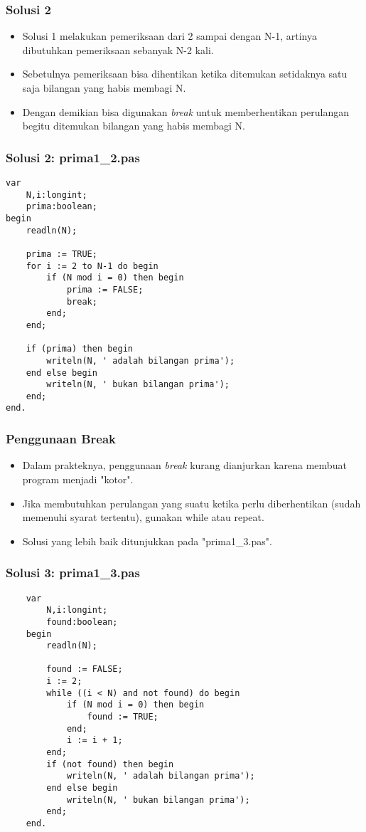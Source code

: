 \documentclass{beamer}
\begin{document}
\begin{frame}
\frametitle{Solusi 2}
\begin{itemize}
	\item Solusi 1 melakukan pemeriksaan dari 2 sampai dengan N-1, artinya dibutuhkan pemeriksaan sebanyak N-2 kali.
	\item Sebetulnya pemeriksaan bisa dihentikan ketika ditemukan setidaknya satu saja bilangan yang habis membagi N.
	\item Dengan demikian bisa digunakan \textit{break} untuk memberhentikan perulangan begitu ditemukan bilangan yang habis membagi N.
\end{itemize}
\end{frame}

\begin{frame}[fragile]
\frametitle{Solusi 2: prima1\_2.pas}
\begin{lstlisting}
var
    N,i:longint;
    prima:boolean;
begin
    readln(N);

    prima := TRUE;
    for i := 2 to N-1 do begin
        if (N mod i = 0) then begin
            prima := FALSE;
            break;
        end;
    end;

    if (prima) then begin
        writeln(N, ' adalah bilangan prima');
    end else begin
        writeln(N, ' bukan bilangan prima');
    end;
end.
\end{lstlisting}
\end{frame}

\begin{frame}
\frametitle{Penggunaan Break}
\begin{itemize}
	\item Dalam prakteknya, penggunaan \textit{break} kurang dianjurkan karena membuat program menjadi "kotor".
	\item Jika membutuhkan perulangan yang suatu ketika perlu diberhentikan (sudah memenuhi syarat tertentu), gunakan while atau repeat.
	\item Solusi yang lebih baik ditunjukkan pada "prima1\_3.pas".
\end{itemize}
\end{frame}

\begin{frame}[fragile]
\frametitle{Solusi 3: prima1\_3.pas}
\begin{lstlisting}
	var
	    N,i:longint;
	    found:boolean;
	begin
	    readln(N);
	
	    found := FALSE;
	    i := 2;
	    while ((i < N) and not found) do begin
	        if (N mod i = 0) then begin
	            found := TRUE;
	        end;
	        i := i + 1;
	    end;
	    if (not found) then begin
	        writeln(N, ' adalah bilangan prima');
	    end else begin
	        writeln(N, ' bukan bilangan prima');
	    end;
	end.
\end{lstlisting}
\end{frame}
\end{document}
